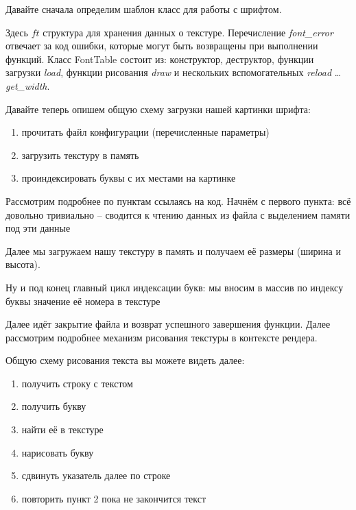 \pagebreak

Давайте сначала определим шаблон класс для работы с шрифтом.


Здесь \( ft \) структура для хранения данных о текстуре. Перечисление \emph{font\_error} отвечает за код 
ошибки, которые могут быть возвращены при выполнении функций. Класс FontTable состоит из: конструктор, 
деструктор, функции загрузки \emph{load}, функции рисования \emph{draw} и нескольких вспомогательных 
\emph{reload} \ldots \emph{get\_width}.

Давайте теперь опишем общую схему загрузки нашей картинки шрифта:
\begin{enumerate}\itemsep-5pt
    \item прочитать файл конфигурации (перечисленные параметры)
    \item загрузить текстуру в память
    \item проиндексировать буквы с их местами на картинке
\end{enumerate}

Рассмотрим подробнее по пунктам ссылаясь на код. Начнём с первого пункта: всё довольно тривиально -- 
сводится к чтению данных из файла с выделением памяти под эти данные


Далее мы загружаем нашу текстуру в память и получаем её размеры (ширина и высота).


Ну и под конец главный цикл индексации букв: мы вносим в массив по индексу буквы значение её номера в 
текстуре


Далее идёт закрытие файла и возврат успешного завершения функции. Далее рассмотрим подробнее механизм 
рисования текстуры в контексте рендера. 

\pagebreak

Общую схему рисования текста вы можете видеть далее:
\begin{enumerate}\itemsep-5pt
    \item получить строку с текстом
    \item получить букву
    \item найти её в текстуре
    \item нарисовать букву
    \item сдвинуть указатель далее по строке
    \item повторить пункт 2 пока не закончится текст
\end{enumerate}

